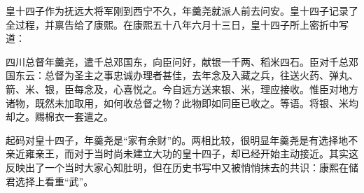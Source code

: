 
皇十四子作为抚远大将军刚到西宁不久，年羹尧就派人前去问安。皇十四子记录了全过程，并禀告给了康熙。在康熙五十八年六月十三日，皇十四子所上密折中写道：



\begin{bookquote}四川总督年羹尧，遣千总邓国东，向臣问好，献银一千两、稻米四石。臣对千总邓国东云：总督为圣主之事忠诚办理者甚佳，去年念及入藏之兵，往送火药、弹丸、箭、米、银，臣每念及，心喜悦之。今自远方送来银、米，理应接收。惟臣对地方诸物，既然未加取用，如何收总督之物？此物即如同臣已收之。等语。将银、米均却之。赐棉衣一套遣之。\end{bookquote}


起码对皇十四子，年羹尧是“家有余财”的。两相比较，很明显年羹尧是有选择地不亲近雍亲王，而对于当时尚未建立大功的皇十四子，却已经开始主动接近。其实这反映出了一个当时大家心知肚明，但在历史书写中又被悄悄抹去的共识：康熙在储君选择上看重“武”。


